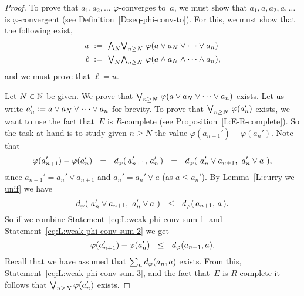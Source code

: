 \documentclass[main.tex]{subfiles}
\begin{document}
\begin{proof}
To prove that $a_1,a_2,\dotsc$ $\varphi$-converges to~$a$,
we must show that $a_1,a,a_2,a,\dotsc$ is $\varphi$-convergent
(see Definition~\ref{D:seq-phi-conv-to}).
For this, 
we must show that the following exist,
\begin{alignat*}{3}
u \ &:=\  \textstyle{\bigwedge}_N \textstyle{\bigvee}_{n\geq N} \ \varphi(a \vee a_N \vee \dotsb \vee a_n)\\
\ell \ &:=\  
\textstyle{\bigvee}_N \textstyle{\bigwedge}_{n\geq N} \ \varphi(a \wedge a_N \wedge \dotsb \wedge a_n),
\end{alignat*}
and we must prove that $\ell = u$.

Let $N\in \mathbb{N}$ be given.
We prove that $\textstyle{\bigvee}_{n\geq N} \ \varphi(a\vee a_N \vee \dotsb \vee a_n)$ exists.
Let us write $a_n ' := a\vee a_N \vee \dotsb \vee a_n$
for brevity. 
 To prove that $\bv_{n\geq N} \ \varphi(a_n')$ exists,
we want to use the fact that~$E$ is $R$-complete
(see Proposition~\ref{L:E-R-complete}).
So the task at hand is to study given $n\geq N$ the 
value $\varphi(a_{n+1}') - \varphi(a_n')$. Note that
\begin{equation}
\label{eq:L:weak-phi-conv-sum-1}
\varphi(a_{n+1}') - \varphi(a_n')
\ \ =\  \ d_{\smash{\varphi}}(\,a_{n+1}',\,a_n'\,)
\ \ =\ \ d_{\smash{\varphi}}(\ a_{n}'\vee a_{n+1},\  a_n'\vee a\ ),
\end{equation}
since $a_{n+1}' = a_{n}'\vee a_{n+1}$
and $a_n' = a_n'\vee a $ (as $a\leq a_n'$).
By Lemma~\ref{L:curry-wc-unif} we have
\begin{equation}
\label{eq:L:weak-phi-conv-sum-2}
\ld\varphi(\ a_n' \vee a_{n+1},\ a_n' \vee a\ )
\ \ \leq\ \ 
\ld\varphi(\,a_{n+1},\,a\,).
\end{equation}
So if we combine Statement~\eqref{eq:L:weak-phi-conv-sum-1}
and Statement~\eqref{eq:L:weak-phi-conv-sum-2}
we get 
\begin{equation}
\label{eq:L:weak-phi-conv-sum-3}
\varphi(a_{n+1}') - \varphi(a_n')
\ \ \leq\ \ 
\ld\varphi(a_{n+1},a).
\end{equation}
Recall that we have assumed that $\sum_n d_{\smash{\varphi}}(a_n,a)$ exists.
From this,
Statement~\eqref{eq:L:weak-phi-conv-sum-3},
and the fact that~$E$ is $R$-complete
it follows that $\textstyle{\bigvee}_{n\geq N} \,\varphi(a_n')$ exists.


\end{proof}
\end{document}
